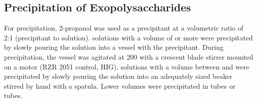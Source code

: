 \subsection{Precipitation of Exopolysaccharides\label{subsec-met-precipitation}}
For precipitation, 2-propanol was used as a precipitant at a volumetric ratio of 2:1 (precipitant to \eps{} solution). \EPS{} solutions with a volume of  or more were precipitated by slowly pouring the \eps{} solution into a vessel with the precipitant. During precipitation, the vessel was agitated at \SI{200}{\rpm} with a crescent blade stirrer mounted on a motor (RZR 2051 control, HIG). \EPS{} solutions with a volume between  and  were precipitated by slowly pouring the \eps{} solution into an adequately sized beaker stirred by hand with a spatula. Lower volumes were precipitated in  tubes or  tubes.

